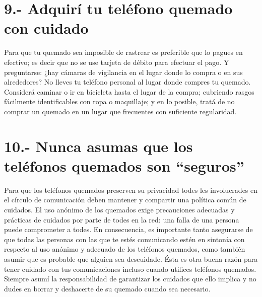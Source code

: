 \documentclass[
]{book}
\begin{document}
\hypertarget{adquiruxed-tu-teluxe9fono-quemado-con-cuidado}{%
\chapter*{9.- Adquirí tu teléfono quemado con cuidado}\label{adquiruxed-tu-teluxe9fono-quemado-con-cuidado}}

Para que tu quemado sea imposible de rastrear es preferible que lo pagues en efectivo; es decir que no se use tarjeta de débito para efectuar el pago. Y preguntarse: ¿hay cámaras de vigilancia en el lugar donde lo compra o en sus alrededores? No lleves tu teléfono personal al lugar donde compres tu quemado. Considerá caminar o ir en bicicleta hasta el lugar de la compra; cubriendo rasgos fácilmente identificables con ropa o maquillaje; y en lo posible, tratá de no comprar un quemado en un lugar que frecuentes con suficiente regularidad.

\hypertarget{nunca-asumas-que-los-teluxe9fonos-quemados-son-seguros}{%
\chapter*{10.- Nunca asumas que los teléfonos quemados son ``seguros''}\label{nunca-asumas-que-los-teluxe9fonos-quemados-son-seguros}}

Para que los teléfonos quemados preserven su privacidad todes les involucrades en el círculo de comunicación deben mantener y compartir una política común de cuidados. El uso anónimo de los quemados exige precauciones adecuadas y prácticas de cuidados por parte de todes en la red: una falla de una persona puede comprometer a todes. En consecuencia, es importante tanto asegurarse de que todas las personas con las que te estés comunicando estén en sintonía con respecto al uso anónimo y adecuado de los teléfonos quemados, como también asumir que es probable que alguien sea descuidade. Ésta es otra buena razón para tener cuidado con tus comunicaciones incluso cuando utilices teléfonos quemados. Siempre asumí la responsabilidad de garantizar los cuidados que ello implica y no dudes en borrar y deshacerte de su quemado cuando sea necesario.

  
\end{document}
